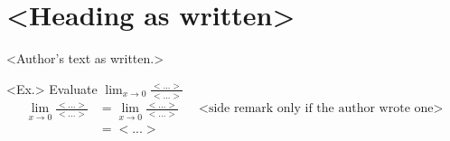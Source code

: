 \documentclass[12pt]{article}
\begin{document}
\begin{center}
  {\Large\bfseries <Title exactly as written>}
\end{center}

\section*{<Heading as written>}

<Author's text as written.>

<Ex.>\; Evaluate \(\displaystyle \lim_{x\to 0}\frac{<...>}{<...>}\)
\begin{align*}
  \lim_{x\to 0}\frac{<...>}{<...>}
    &= \lim_{x\to 0}\frac{<...>}{<...>} && \text{<side remark only if the author wrote one>}\\
    &= <...>
\end{align*}
\end{document}
